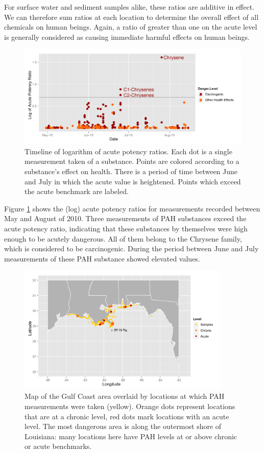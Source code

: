 \documentclass[authoryear,12pt]{elsarticle}
\begin{document}
For surface water and sediment samples alike, these ratios are additive in effect. We can therefore sum ratios at each location to determine the overall effect of all chemicals on human beings. {Again}, a ratio of greater than  {one} on the acute level  {is generally} considered as causing immediate harmful effects on human beings.


\begin{figure}[htbp] %
   \centering
   \includegraphics[width=5in]{acute-timeline.png} 
   \caption{Timeline of logarithm of acute potency ratios. Each dot is a single measurement taken of a substance. Points are colored according to a substance's effect on health. There is a period of time between June and July in which the acute value is heightened.  Points which exceed the acute benchmark are labeled.}
   \label{pah-timeline}
\end{figure}


Figure \ref{pah-timeline} shows the (log) acute potency ratios for measurements recorded between May and August of 2010. Three measurements of PAH substances exceed the acute potency ratio, indicating that these substances by themselves were high enough to be acutely dangerous. All of them belong to the Chrysene family, which  is considered to be carcinogenic. During the  period between June and July  measurements of these PAH substance showed elevated values.

\begin{figure}[htbp] %
   \centering
   \includegraphics[width=4in]{chron-acute-map.png} 
   \caption{Map of the Gulf Coast area overlaid by locations at which PAH measurements were taken (yellow). Orange dots represent locations that are at a chronic level, red dots mark locations with an acute level.  The most dangerous area is along the outermost shore of Louisiana: many locations here have PAH levels at or above chronic or acute benchmarks.}
   \label{pah-map}
\end{figure}
\end{document}
